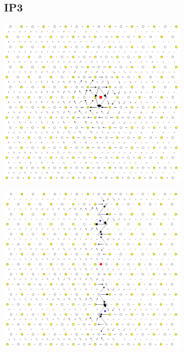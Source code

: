 \documentclass[11pt]{article}
\begin{document}
\subsection{IP3}
\label{sec:org92fa9f0}
\begin{center}
\includegraphics[width=0.7\textwidth]{Images/final_model_IP3_partial_dd_initial.png}
\end{center}
\begin{center}
\includegraphics[width=0.7\textwidth]{Images/final_model_IP3_partial_dd_final.png}
\end{center}
\end{document}

